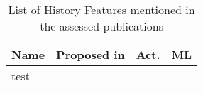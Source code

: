 \begin{table}[htbp]
    \caption{List of History Features mentioned in the assessed publications}
    \label{tab:feat_History}
    \centering
    \begin{tabular}{m{} m{} c c}
        \toprule
        \textbf{Name} & \textbf{Proposed in} & \textbf{Act.} & \textbf{ML} \\ 
        \midrule
        test
        \bottomrule
    \end{tabular}
\end{table}